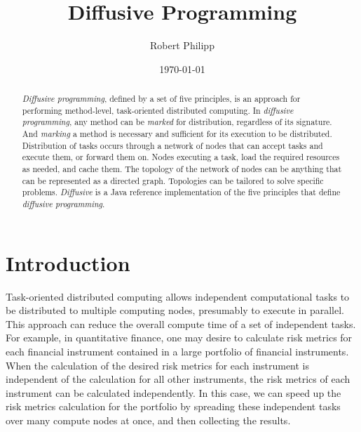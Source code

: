 \documentclass[11pt]{article}
\begin{document}
\title{Diffusive Programming}
\author{Robert Philipp}
\date{\today}
\maketitle

%
%
\begin{abstract}
\emph{Diffusive programming}, defined by a set of five principles, is an approach for performing method-level, task-oriented distributed computing. In \emph{diffusive programming}, any method can be \emph{marked} for distribution, regardless of its signature. And \emph{marking} a method is necessary and sufficient for its execution to be distributed. Distribution of tasks occurs through a network of nodes that can accept tasks and execute them, or forward them on. Nodes executing a task, load the required resources as needed, and cache them. The topology of the network of nodes can be anything that can be represented as a directed graph. Topologies can be tailored to solve specific problems. \emph{Diffusive} is a Java reference implementation of the five principles that define \emph{diffusive programming}.
\end{abstract}
%
%
\section{Introduction}
Task-oriented distributed computing allows independent computational tasks to be distributed to multiple computing nodes, presumably to execute in parallel. This approach can reduce the overall compute time of a set of independent tasks. For example, in quantitative finance, one may desire to calculate risk metrics for each financial instrument contained in a large portfolio of financial instruments. When the calculation of the desired risk metrics for each instrument is independent of the calculation for all other instruments, the risk metrics of each instrument can be calculated independently. In this case, we can speed up the risk metrics calculation for the portfolio by spreading these independent tasks over many compute nodes at once, and then collecting the results.
\end{document}
